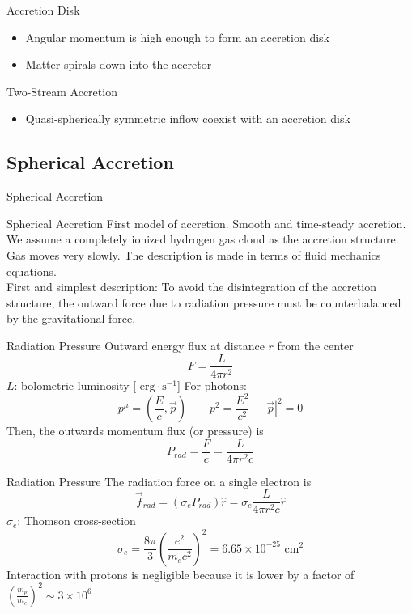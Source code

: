 \documentclass{beamer}
\begin{document}
\begin{frame}{Accretion Disk}
	\begin{itemize}
	\item Angular momentum is high enough to form an accretion disk
	\pause
	\item Matter spirals down into the accretor
	\end{itemize}
\end{frame}

\begin{frame}{Two-Stream Accretion}
	\begin{itemize}
	\item Quasi-spherically symmetric inflow coexist with an accretion disk
	\end{itemize}
\end{frame}

\subsection{Spherical Accretion}
\begin{frame}
	\huge
    Spherical Accretion
\end{frame}

\begin{frame}{Spherical Accretion}
	First model of accretion. Smooth and time-steady 	accretion.\\
	\pause
	\bigskip	
	We assume a completely ionized hydrogen gas cloud as the accretion structure.\\
	\pause
	\bigskip	
	Gas moves very slowly.  The description is made in terms of fluid mechanics equations.\\
	\pause
	\bigskip
	First and simplest description: To avoid the disintegration of the accretion structure, the outward force due to radiation pressure must be counterbalanced by the gravitational force.\\
\end{frame}

\begin{frame}{Radiation Pressure}
	Outward energy flux at distance $r$ from the center
	\[ F = \frac{L}{4\pi r^2}\]
	\pause
	$L$: bolometric luminosity [$\textrm{ erg} \cdot \textrm{s}^{-1}$]
	\pause
	For photons:
	\[ p^\mu = \left( \frac{E}{c}, \vec{p} \right) \qquad
	p^2 = \frac{E^2}{c^2} - |\vec{p}|^2 = 0\]
	\pause
	Then, the outwards momentum flux (or pressure) is
	\[P_{rad} = \frac{F}{c} = \frac{L}{4\pi r^2 c}\] 
\end{frame}

\begin{frame}{Radiation Pressure}
	The radiation force on a single electron is
	\[\vec{f}_{rad} = ( \sigma_e P_{rad} ) \hat{r} = \sigma_e \frac{L}{4\pi r^2 c} \hat{r}\] 
	\pause
	$\sigma_e$: Thomson cross-section
	\pause
	\[\sigma_e = \frac{8\pi}{3} \left( \frac{e^2}{m_e c^2} \right)^2 = 6.65 \times 10^{-25} \textrm{ cm}^2 \]
	\footnotesize
	Interaction with protons is negligible because it is lower by a factor of $\left(\frac{m_p}{m_e}\right)^2 \sim 3 \times 10^6$
\end{frame}
\end{document}
